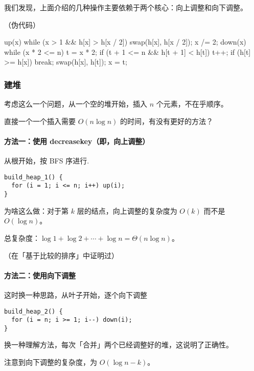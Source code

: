 我们发现，上面介绍的几种操作主要依赖于两个核心：向上调整和向下调整。

（伪代码）

\begin{cppcode}
up(x) {
  while (x > 1 && h[x] > h[x / 2]) {
    swap(h[x], h[x / 2]);
    x /= 2;
  }
}
down(x) {
  while (x * 2 <= n) {
    t = x * 2;
    if (t + 1 <= n && h[t + 1] < h[t]) t++;
    if (h[t] >= h[x]) break;
    swap(h[x], h[t]);
    x = t;
  }
}
\end{cppcode}

\subsubsection{建堆}

考虑这么一个问题，从一个空的堆开始，插入 $n$ 个元素，不在乎顺序。

直接一个一个插入需要 $O(n \log n)$ 的时间，有没有更好的方法？

\paragraph{方法一：使用 decreasekey（即，向上调整）}

从根开始，按 BFS 序进行.

\begin{verbatim}
build_heap_1() {
  for (i = 1; i <= n; i++) up(i);
}
\end{verbatim}

为啥这么做：对于第 $k$ 层的结点，向上调整的复杂度为 $O(k)$ 而不是 $O(\log n)$。

总复杂度：$\log 1 + \log 2 + \cdots + \log n = \Theta(n \log n)$。

（在「基于比较的排序」中证明过）

\paragraph{方法二：使用向下调整}

这时换一种思路，从叶子开始，逐个向下调整

\begin{verbatim}
build_heap_2() {
  for (i = n; i >= 1; i--) down(i);
}
\end{verbatim}

换一种理解方法，每次「合并」两个已经调整好的堆，这说明了正确性。

注意到向下调整的复杂度，为 $O(\log n - k)$。

